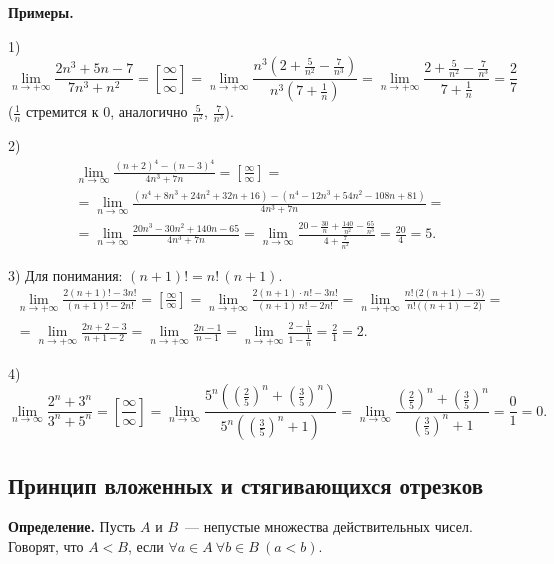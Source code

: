\documentclass[a4paper,11pt]{article}
\begin{document}
\textbf{Примеры.}

1)
\[
  \lim_{n \to +\infty} \frac{2n^3 + 5n - 7}{7n^3 + n^2}
  = \left[\frac{\infty}{\infty}\right]
  = \lim_{n \to +\infty} \frac{n^3 \left(2 + \frac{5}{n^2} - \frac{7}{n^3}\right)}{n^3 \left(7 + \frac{1}{n}\right)}
  = \lim_{n \to +\infty} \frac{2 + \frac{5}{n^2} - \frac{7}{n^3}}{7 + \frac{1}{n}} = \frac{2}{7}
\]
($\frac{1}{n}$ стремится к $0$, аналогично $\frac{5}{n^2}$, $\frac{7}{n^3}$).

2)
\begin{multline*}
  \lim_{n \to \infty} \frac{(n + 2)^4 - (n - 3)^4}{4n^3 + 7n}
  = \left[\frac{\infty}{\infty}\right] = \\
  = \lim_{n \to \infty} \frac{(n^4 + 8n^3 + 24n^2 + 32n + 16) - (n^4 - 12n^3 + 54n^2 - 108n + 81)}{4n^3 + 7n} = \\
  = \lim_{n \to \infty} \frac{20n^3 - 30n^2 + 140n - 65}{4n^3 + 7n}
  = \lim_{n \to \infty} \frac{20 - \frac{30}{n} + \frac{140}{n^2} - \frac{65}{n^3}}{4 + \frac{7}{n^2}}
  = \frac{20}{4} = 5.
\end{multline*}

3) Для понимания: $(n + 1)! = n!\,(n + 1)$.
\begin{multline*}
  \lim_{n \to +\infty} \frac{2(n + 1)! - 3n!}{(n + 1)! - 2n!}
  = \left[\frac{\infty}{\infty}\right]
  = \lim_{n \to +\infty} \frac{2(n + 1) \cdot n! - 3n!}{(n + 1)\,n! - 2n!}
  = \lim_{n \to +\infty} \frac{n!\,\big(2(n + 1) - 3\big)}{n!\,\big((n + 1) - 2\big)} = \\
  = \lim_{n \to +\infty} \frac{2n + 2 - 3}{n + 1 - 2}
  = \lim_{n \to +\infty} \frac{2n - 1}{n - 1}
  = \lim_{n \to +\infty} \frac{2 - \frac{1}{n}}{1 - \frac{1}{n}} = \frac{2}{1} = 2.
\end{multline*}

4)
\[
  \lim_{n \to \infty} \frac{2^n + 3^n}{3^n + 5^n}
  = \left[\frac{\infty}{\infty}\right]
  = \lim_{n \to \infty} \frac{5^n \left(\left(\frac{2}{5}\right)^n + \left(\frac{3}{5}\right)^n\right)}{5^n \left(\left(\frac{3}{5}\right)^n + 1\right)}
  = \lim_{n \to \infty} \frac{\left(\frac{2}{5}\right)^n + \left(\frac{3}{5}\right)^n}{\left(\frac{3}{5}\right)^n + 1}
  = \frac{0}{1} = 0.
\]

\subsection{Принцип вложенных и стягивающихся отрезков}

\begin{opr}
\textbf{Определение.} Пусть $A$ и $B$~--- непустые множества действительных чисел. Говорят, что $A < B$, если
$\forall a \in A\ \forall b \in B\ (a < b)$.
\end{opr}
\end{document}
